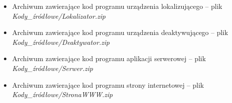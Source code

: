 \begin{itemize}
  \item Archiwum zawierające kod programu urządzenia lokalizującego -- plik\\ \textit{Kody\_źródłowe/Lokalizator.zip}
  
  \item Archiwum zawierające kod programu urządzenia deaktywującego -- plik\\ \textit{Kody\_źródłowe/Deaktywator.zip}

  \item Archiwum zawierające kod programu aplikacji serwerowej -- plik\\ \textit{Kody\_źródłowe/Serwer.zip}
  
  \item Archiwum zawierające kod programu strony internetowej -- plik\\ \textit{Kody\_źródłowe/StronaWWW.zip}

\end{itemize}


